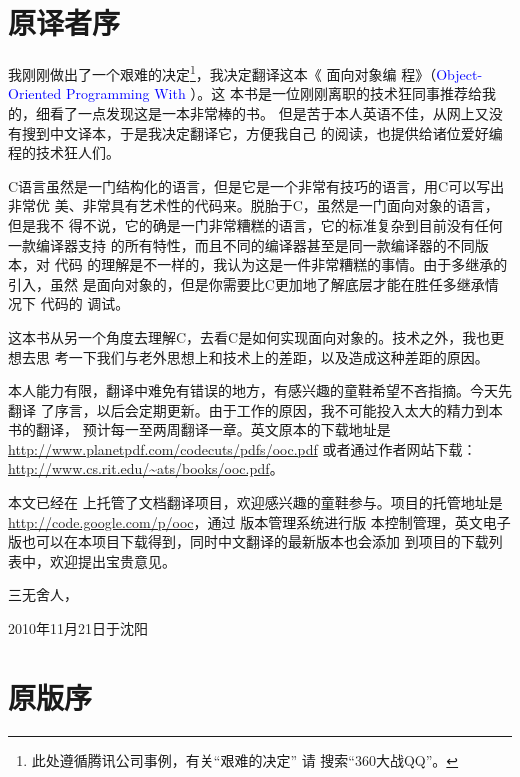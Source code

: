\chapter{原译者序}
\label{ch:TransPreface}

我刚刚做出了一个艰难的决定\footnote{此处遵循腾讯公司事例，有关“艰难的决定”
请 \Google{} 搜索“360大战QQ”。}，我决定翻译这本《 面向对象编
程》（\textcolor{blue}{Object-Oriented Programming With }）。这
本书是一位刚刚离职的技术狂同事推荐给我的，细看了一点发现这是一本非常棒的书。
但是苦于本人英语不佳，从网上又没有搜到中文译本，于是我决定翻译它，方便我自己
的阅读，也提供给诸位爱好编程的技术狂人们。

C语言虽然是一门结构化的语言，但是它是一个非常有技巧的语言，用C可以写出非常优
美、非常具有艺术性的代码来。\cpp 脱胎于C，虽然是一门面向对象的语言，但是我不
得不说，它的确是一门非常糟糕的语言，它的标准复杂到目前没有任何一款编译器支持
\cpp 的所有特性，而且不同的编译器甚至是同一款编译器的不同版本，对 \cpp 代码
的理解是不一样的，我认为这是一件非常糟糕的事情。由于多继承的引入，虽然 \cpp
是面向对象的，但是你需要比C更加地了解底层才能在胜任多继承情况下 \cpp 代码的
调试。

这本书从另一个角度去理解C，去看C是如何实现面向对象的。技术之外，我也更想去思
考一下我们与老外思想上和技术上的差距，以及造成这种差距的原因。

本人能力有限，翻译中难免有错误的地方，有感兴趣的童鞋希望不吝指摘。今天先翻译
了序言，以后会定期更新。由于工作的原因，我不可能投入太大的精力到本书的翻译，
预计每一至两周翻译一章。英文原本的下载地址是
\url{http://www.planetpdf.com/codecuts/pdfs/ooc.pdf}
或者通过作者网站下载：\url{http://www.cs.rit.edu/~ats/books/ooc.pdf}。

本文已经在 
上托管了文档翻译项目，欢迎感兴趣的童鞋参与。项目的托管地址是
\url{http://code.google.com/p/ooc}，通过 版本管理系统进行版
本控制管理，英文电子版也可以在本项目下载得到，同时中文翻译的最新版本也会添加
到项目的下载列表中，欢迎提出宝贵意见。

\bigskip
\bigskip

\begin{flushright}
    三无舍人，

    2010年11月21日于沈阳
\end{flushright}

\newpage{\thispagestyle{empty}\cleardoublepage}

\chapter{原版序}
\label{ch:OrigPreface}

